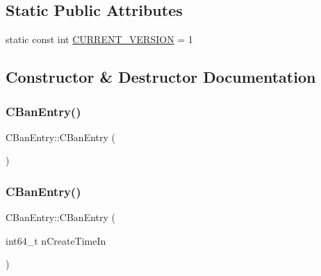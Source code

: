 \subsection*{Static Public Attributes}
\begin{DoxyCompactItemize}
\item 
static const int \mbox{\hyperlink{class_c_ban_entry_a5cea0be04742cec8903b4f3a558bcdf9}{C\+U\+R\+R\+E\+N\+T\+\_\+\+V\+E\+R\+S\+I\+ON}} = 1
\end{DoxyCompactItemize}


\subsection{Constructor \& Destructor Documentation}
\mbox{\label{class_c_ban_entry_a669048b5cb38027b18ba179a1027211b}} 
\subsubsection{\texorpdfstring{C\+Ban\+Entry()}{CBanEntry()}\hspace{0.1cm}{\footnotesize\ttfamily [1/2]}}
{\footnotesize\ttfamily C\+Ban\+Entry\+::\+C\+Ban\+Entry (\begin{DoxyParamCaption}{ }\end{DoxyParamCaption})\hspace{0.3cm}{\ttfamily [inline]}}

\mbox{\label{class_c_ban_entry_a6b787cdf29a5ce8688845e15f5153a64}} 
\subsubsection{\texorpdfstring{C\+Ban\+Entry()}{CBanEntry()}\hspace{0.1cm}{\footnotesize\ttfamily [2/2]}}
{\footnotesize\ttfamily C\+Ban\+Entry\+::\+C\+Ban\+Entry (\begin{DoxyParamCaption}\item[{int64\+\_\+t}]{n\+Create\+Time\+In }\end{DoxyParamCaption})\hspace{0.3cm}{\ttfamily [inline]}}



